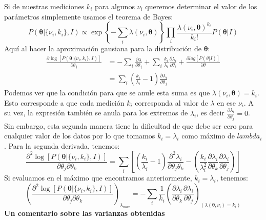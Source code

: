 \documentclass[aps,onecolumn,12pt,notitlepage]{revtex4-1}
\begin{document}
Si de nuestras mediciones $k_{i}$ para algunos $\nu_{i}$ queremos determinar el valor de los parámetros simplemente usamos el teorema de Bayes:
\begin{equation}
P\left(\boldsymbol{\theta}| \{\nu_{i},k_{i}\},I\right) \propto    \exp\left\{-\sum_{i} \lambda\left( \nu_{i},\boldsymbol{\theta}\right)\right\} \prod_{i}\frac{\lambda\left(\nu_{i},\boldsymbol{\theta}\right)^{k_{i}}}{k_{i}!} P(\boldsymbol{\theta}|I)
\end{equation}
Aquí al hacer la aproximación gausiana para la distribución de $\boldsymbol{\theta}$:
\begin{equation}
\begin{aligned}
\frac{\partial \log \left[P\left(\boldsymbol{\theta} | \{ \nu_{i},k_{i} \},I \right)\right]}{ \partial \theta_{j}} &= -\sum_{i} \frac{\partial \lambda}{\partial \theta_{j}} + \sum_{i} \frac{k_{i}}{\lambda_{i}} \frac{\partial  \lambda_{i}}{\partial \theta_{i}}  + \frac{\partial log\left[P(\theta|I)\right]}{\partial \theta} \\
& = \sum_{i} \left( \frac{k_{i}}{\lambda_{i}} -1\right) \frac{\partial \lambda_{i}}{\partial \theta_{j}} 
\end{aligned}
\end{equation}
Podemos ver que la condición para que se anule esta suma es que $\lambda\left(\nu_{i},\boldsymbol{\theta}\right) = k_{i}$. Esto corresponde a que cada medición $k_{i}$ corresponda al valor de $\lambda$ en ese $\nu_{i}$. A su vez, la expresión también se anula para los extremos de $\lambda_{i}$, es decir $\frac{\partial \lambda_{i}}{\partial \theta_{j}} = 0$. Sin embargo, esta segunda manera tiene la dificultad de que debe ser cero para cualquier valor de los datos por lo que tomamos $k_{i}=\lambda_{i}$ como máximo de $lambda_{i}$.
Para la segunda derivada, tenemos:
\begin{equation}
\frac{\partial^{2} \log \left[P\left(\boldsymbol{\theta} | \{ \nu_{i},k_{i} \},I \right)\right]}{ \partial \theta_{j} \partial \theta_{k}} =  \sum_{i} \left[ \left( \frac{k_{i}}{\lambda_{i}} -1\right) \frac{\partial^{2} \lambda_{i}}{\partial \theta_{j} \theta_{k}} - \left(\frac{k_{i}}{\lambda^{2}_{i}}\frac{\partial \lambda_{i}}{\partial \theta_{k}}\frac{\partial \lambda_{i}}{\partial \theta_{j}}  \right)\right]
\end{equation}
Si evaluamos en el máximo que encontramos anteriormente, $k_{i} = \lambda_{i}$, tenemos:
\begin{equation}
\left(\frac{\partial^{2} \log \left[P\left(\boldsymbol{\theta} | \{ \nu_{i},k_{i} \},I \right)\right]}{ \partial \theta_{j} \partial \theta_{k}}\right)_{\lambda_{max}}=  -\sum_{i}  \frac{1}{k_{i}}\left(\frac{\partial \lambda_{i}}{\partial \theta_{k}}\frac{\partial \lambda_{i}}{\partial \theta_{j}}\right)_{\left(\lambda (\boldsymbol{\theta},\nu_{i}) = k_{i}\right)}   
\end{equation}
\newpage
\textbf{Un comentario sobre las varianzas obtenidas}
\end{document}
